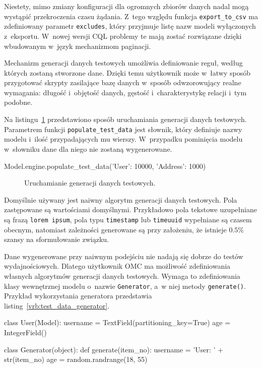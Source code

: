 Niestety, mimo zmiany konfiguracji dla ogromnych zbiorów danych nadal mogą wystąpić przekroczenia czasu żądania. Z~tego względu funkcja \verb+export_to_csv+ ma zdefiniowany parametr \verb+excludes+, który przyjmuje listę nazw modeli wyłączonych z~eksportu. W~nowej wersji CQL problemy te mają zostać rozwiązane dzięki wbudowanym w~język mechanizmom paginacji.

Mechanizm generacji danych testowych umożliwia definiowanie reguł, według których zostaną stworzone dane. Dzięki temu użytkownik może w~łatwy sposób przygotować skrypty zasilające bazę danych w~sposób odwzorowujący realne wymagania: długość i~objętość danych, gęstość i~charakterystykę relacji i~tym podobne. 

Na listingu~\ref{vrb:test_data_populatiuon} przedstawiono sposób uruchamiania generacji danych testowych. Parametrem funkcji \verb+populate_test_data+ jest słownik, który definiuje nazwy modelu i~ilość przypadających mu wierszy. W~przypadku pominięcia modelu w~słowniku dane dla niego nie zostaną wygenerowane.

\begin{verbbox}[\footnotesize]
	Model.engine.populate_test_data({'User': 10000, 'Address': 1000})
\end{verbbox}

\begin{figure}[ht!]
	\centering
	\theverbbox
	\caption{Uruchamianie generacji danych testowych.}
	\label{vrb:test_data_populatiuon}
\end{figure}

Domyślnie używany jest naiwny algorytm generacji danych testowych. Pola zastępowane są wartościami domyślnymi. Przykładowo pola tekstowe uzupełniane są frazą \verb+lorem ipsum+, pola typu \verb+timestamp+ lub \verb+timeuuid+ wypełniane są czasem obecnym, natomiast zależności generowane są przy założeniu, że istnieje $0.5\%$ szansy na sformułowanie związku. 

Dane wygenerowane przy naiwnym podejściu nie nadają się dobrze do testów wydajnościowych. Dlatego użytkownik OMC ma możliwość zdefiniowania własnych algorytmów generacji danych testowych. Wymaga to zdefiniowania klasy wewnętrznej modelu o~nazwie \verb+Generator+, a~w niej metody \verb+generate()+. Przykład wykorzystania generatora przedstawia listing~\ref{vrb:test_data_generator}.

\begin{verbbox}[\footnotesize]
	class User(Model):
	    username = TextField(partitioning_key=True)
	    age = IntegerField()

	    class Generator(object):
	        def generate(item_no):
	            username = 'User: ' + str(item_no)
	            age = random.randrange(18, 55)
\end{verbbox}

